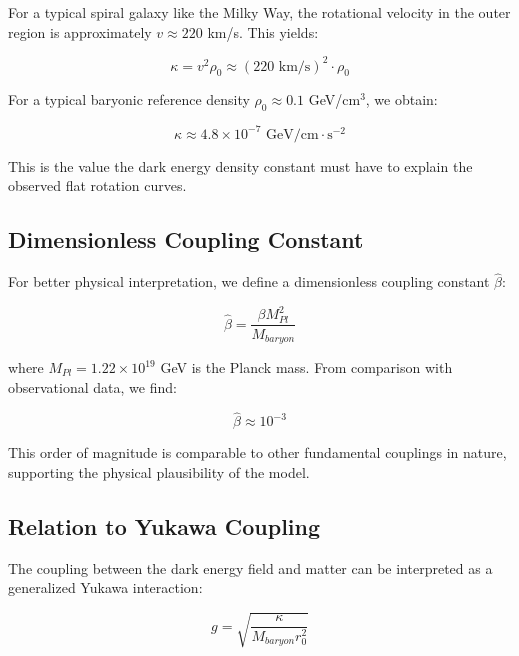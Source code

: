 \documentclass[a4paper,12pt]{article}
\begin{document}
	For a typical spiral galaxy like the Milky Way, the rotational velocity in the outer region is approximately $v \approx 220$ km/s. This yields:
	
	\begin{equation}
		\kappa = v^2 \rho_0 \approx (220 \text{ km/s})^2 \cdot \rho_0
	\end{equation}
	
	For a typical baryonic reference density $\rho_0 \approx 0.1$ GeV/cm$^3$, we obtain:
	
	\begin{equation}
		\kappa \approx 4.8 \times 10^{-7} \text{ GeV/cm} \cdot \text{s}^{-2}
	\end{equation}
	
	This is the value the dark energy density constant must have to explain the observed flat rotation curves.
	
	\subsection{Dimensionless Coupling Constant}
	
	For better physical interpretation, we define a dimensionless coupling constant $\hat{\beta}$:
	
	\begin{equation}
		\hat{\beta} = \frac{\beta M_{Pl}^2}{M_{baryon}}
	\end{equation}
	
	where $M_{Pl} = 1.22 \times 10^{19}$ GeV is the Planck mass. From comparison with observational data, we find:
	
	\begin{equation}
		\hat{\beta} \approx 10^{-3}
	\end{equation}
	
	This order of magnitude is comparable to other fundamental couplings in nature, supporting the physical plausibility of the model.
	
	\subsection{Relation to Yukawa Coupling}
	
	The coupling between the dark energy field and matter can be interpreted as a generalized Yukawa interaction:
	
	\begin{equation}
		g = \sqrt{\frac{\kappa}{M_{baryon} r_0^2}}
	\end{equation}
	
\end{document}
